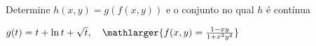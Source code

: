 Determine $h(x,y) = g(f(x,y))$ e o conjunto no qual $h$ é contínua

$g(t)=t+\ln t + \sqrt t, \quad \mathlarger{f(x,y)=\frac{1-xy}{1+x^2y^2}}$

